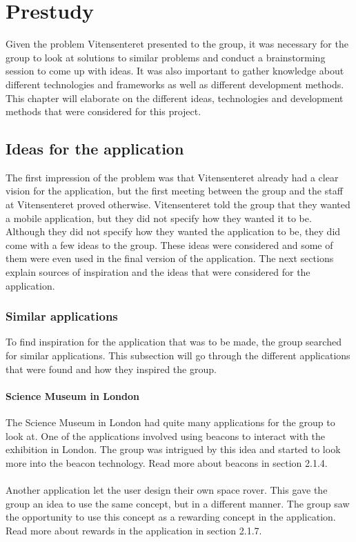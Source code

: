 \chapter{Prestudy}
Given the problem Vitensenteret presented to the group, it was necessary for the group to look at solutions to similar problems and conduct a brainstorming session to come up with ideas. It was also important to gather knowledge about different technologies and frameworks as well as different development methods. This chapter will elaborate on the different ideas, technologies and development methods that were considered for this project.

\section{Ideas for the application}
The first impression of the problem was that Vitensenteret already had a clear vision for the application, but the first meeting between the group and the staff at Vitensenteret proved otherwise. Vitensenteret told the group that they wanted a mobile application, but they did not specify how they wanted it to be. Although they did not specify how they wanted the application to be, they did come with a few ideas to the group. These ideas were considered and some of them were even used in the final version of the application. The next sections explain sources of inspiration and the ideas that were considered for the application.\\

\subsection{Similar applications}
To find inspiration for the application that was to be made, the group searched for similar applications. This subsection will go through the different applications that were found and how they inspired the group.

\subsubsection{Science Museum in London}
The Science Museum in London \cite{smlondon} had quite many applications for the group to look at. One of the applications involved using beacons to interact with the exhibition in London\cite{smlondon1}. The group was intrigued by this idea and started to look more into the beacon technology. Read more about beacons in section 2.1.4.\\
\\
Another application let the user design their own space rover\cite{smlondon2}. This gave the group an idea to use the same concept, but in a different manner. The group saw the opportunity to use this concept as a rewarding concept in the application. Read more about rewards in the application in section 2.1.7.


